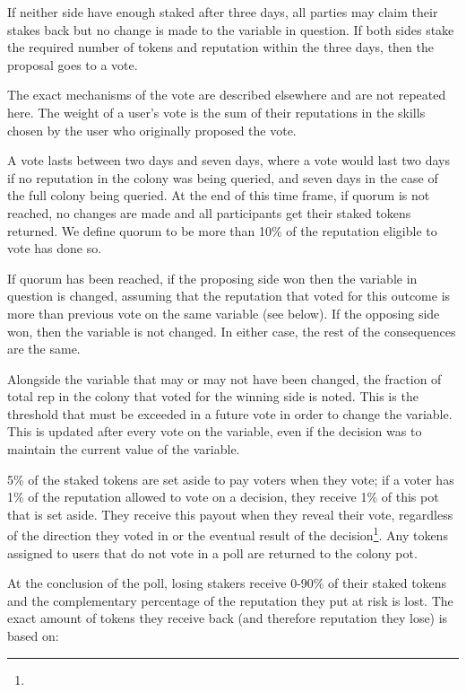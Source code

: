 If neither side have enough staked after three days, all parties may claim their stakes back but no change is made to the variable in question. If both sides stake the required number of tokens and reputation within the three days, then the proposal goes to a vote.

The exact mechanisms of the vote are described elsewhere and are not repeated here. The weight of a user’s vote is the sum of their reputations in the skills chosen by the user who originally proposed the vote.

A vote lasts between two days and seven days, where a vote would last two days if no reputation in the colony was being queried, and seven days in the case of the full colony being queried. At the end of this time frame, if quorum is not reached, no changes are made and all participants get their staked tokens returned. We define quorum to be more than 10\% of the reputation eligible to vote has done so.

If quorum has been reached, if the proposing side won then the variable in question is changed, assuming that the reputation that voted for this outcome is more than previous vote on the same variable (see below). If the opposing side won, then the variable is not changed. In either case, the rest of the consequences are the same.

Alongside the variable that may or may not have been changed, the fraction of total rep in the colony that voted for the winning side is noted. This is the threshold that must be exceeded in a future vote in order to change the variable. This is updated after every vote on the variable, even if the decision was to maintain the current value of the variable.

5\% of the staked tokens are set aside to pay voters when they vote; if a voter has 1\% of the reputation allowed to vote on a decision, they receive 1\% of this pot that is set aside. They receive this payout when they reveal their vote, regardless of the direction they voted in or the eventual result of the decision\footnote{}. Any tokens assigned to users that do not vote in a poll are returned to the colony pot.

At the conclusion of the poll, losing stakers receive 0-90\% of their staked tokens and the complementary percentage of the reputation they put at risk is lost. The exact amount of tokens they receive back (and therefore reputation they lose) is based on:


